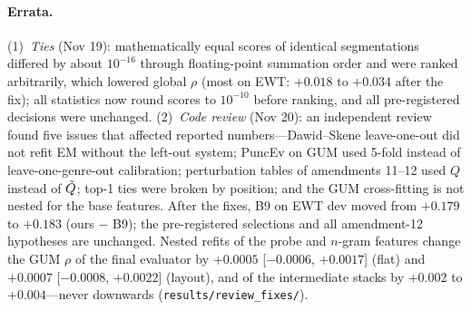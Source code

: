 \begin{table}[h]
  \centering
  \small
  \caption{One-shot hypotheses for the final evaluator (status T).}
  \label{tab:hypotheses}
\end{table}

\paragraph{Errata.} (1)~\emph{Ties} (Nov 19): mathematically equal scores of identical segmentations differed by about
$10^{-16}$ through floating-point summation order and were ranked arbitrarily, which lowered global $\rho$ (most on EWT:
$+0.018$ to $+0.034$ after the fix); all statistics now round scores to $10^{-10}$ before ranking, and all
pre-registered decisions were unchanged. (2)~\emph{Code review} (Nov 20): an independent review found five issues that
affected reported numbers---Dawid--Skene leave-one-out did not refit EM without the left-out system; PuncEv on GUM used
5-fold instead of leave-one-genre-out calibration; perturbation tables of amendments 11--12 used $Q$ instead of $\tilde{Q}$;
top-1 ties were broken by position; and the GUM cross-fitting is not nested for the base features. After the fixes,
B9 on EWT dev moved from $+0.179$ to $+0.183$ (ours $-$ B9); the pre-registered selections and all amendment-12
hypotheses are unchanged. Nested refits of the probe and $n$-gram features change the GUM $\rho$ of the final evaluator by
$+0.0005$ [$-0.0006$, $+0.0017$] (flat) and $+0.0007$ [$-0.0008$, $+0.0022$] (layout), and of the intermediate stacks by
$+0.002$ to $+0.004$---never downwards (\texttt{results/review\_fixes/}).

